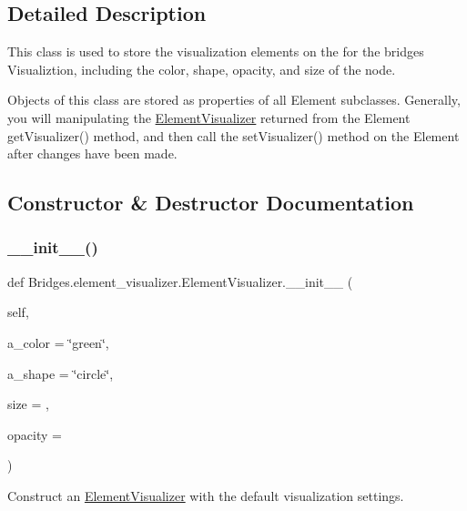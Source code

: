 \subsection{Detailed Description}
This class is used to store the visualization elements on the for the bridges Visualiztion, including the color, shape, opacity, and size of the node. 

Objects of this class are stored as properties of all Element subclasses. Generally, you will manipulating the \mbox{\hyperlink{class_bridges_1_1element__visualizer_1_1_element_visualizer}{Element\+Visualizer}} returned from the Element get\+Visualizer() method, and then call the set\+Visualizer() method on the Element after changes have been made. 

\subsection{Constructor \& Destructor Documentation}
\mbox{\label{class_bridges_1_1element__visualizer_1_1_element_visualizer_a8b7a117ef735871e09cac605f0b71c1c}} 
\subsubsection{\texorpdfstring{\+\_\+\+\_\+init\+\_\+\+\_\+()}{\_\_init\_\_()}}
{\footnotesize\ttfamily def Bridges.\+element\+\_\+visualizer.\+Element\+Visualizer.\+\_\+\+\_\+init\+\_\+\+\_\+ (\begin{DoxyParamCaption}\item[{}]{self,  }\item[{}]{a\+\_\+color = {\ttfamily \char`\"{}green\char`\"{}},  }\item[{}]{a\+\_\+shape = {\ttfamily \char`\"{}circle\char`\"{}},  }\item[{}]{size = {},  }\item[{}]{opacity = {} }\end{DoxyParamCaption})}



Construct an \mbox{\hyperlink{class_bridges_1_1element__visualizer_1_1_element_visualizer}{Element\+Visualizer}} with the default visualization settings. 

